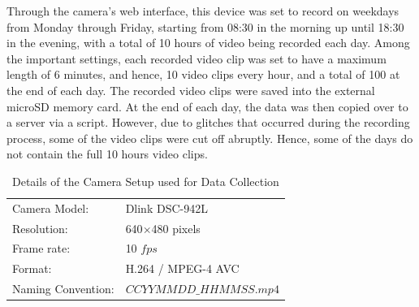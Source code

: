 Through the camera's web interface, this device was set to record on weekdays from Monday through Friday, starting from 08:30 in the morning up until 18:30 in the evening, with a total of 10 hours of video being recorded each day. Among the important settings, each recorded video clip was set to have a maximum length of 6 minutes, and hence, 10 video clips every hour, and a total of 100 at the end of each day. The recorded video clips were saved into the external microSD memory card. At the end of each day, the data was then copied over to a server via a script. However, due to glitches that occurred during the recording process, some of the video clips were cut off abruptly. Hence, some of the days do not contain the full 10 hours video clips. 

\begin{table}[!ht]\centering
\begin{tabular}{ll}
Camera Model: & Dlink DSC-942L        \\
Resolution:   & 640$\times$480 pixels \\
Frame rate:   & 10 $fps$             \\
Format:       & H.264 / MPEG-4 AVC    \\
Naming Convention: & $CCYYMMDD\_HHMMSS.mp4$
\end{tabular}
\vspace{1em}
\caption{Details of the Camera Setup used for Data Collection}
\end{table}

